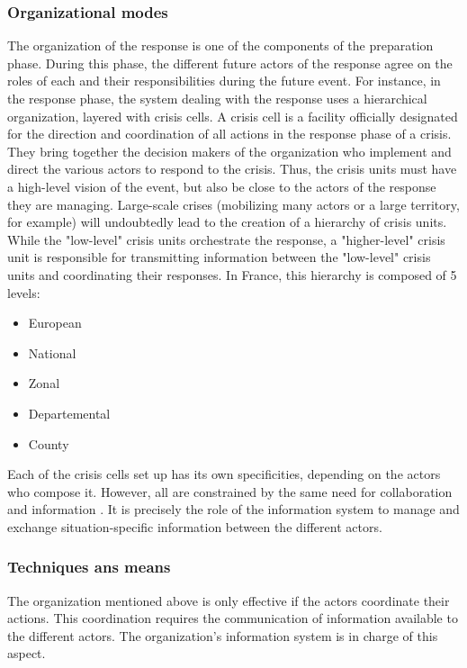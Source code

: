 \subsubsection{Organizational modes}
The organization of the response is one of the components of the preparation phase.
During this phase, the different future actors of the response agree on the roles of each and their responsibilities during the future event.
For instance, in the response phase, the system dealing with the response uses a hierarchical organization, layered with crisis cells.
A crisis cell is a facility officially designated for the direction and coordination of all actions in the response phase of a crisis.
They bring together the decision makers of the organization who implement and direct the various actors to respond to the crisis.
Thus, the crisis units must have a high-level vision of the event, but also be close to the actors of the response they are managing.
Large-scale crises (mobilizing many actors or a large territory, for example) will undoubtedly lead to the creation of a hierarchy of crisis units.
While the "low-level" crisis units orchestrate the response, a "higher-level" crisis unit is responsible for transmitting information between the "low-level" crisis units and coordinating their responses.
In France, this hierarchy is composed of 5 levels:
\begin{itemize}
    \item European
    \item National
    \item Zonal
    \item Departemental
    \item County
\end{itemize}
Each of the crisis cells set up has its own specificities, depending on the actors who compose it.
However, all are constrained by the same need for collaboration \cite{benabenAIFrameworkMetamodel2020,comfortCrisisManagementHindsight2007} and information \cite{comfortCrisisManagementHindsight2007,endsleyTheorySituationAwareness1995}.
It is precisely the role of the information system to manage and exchange situation-specific information between the different actors.

\subsubsection{Techniques ans means}
The organization mentioned above is only effective if the actors coordinate their actions.
This coordination requires the communication of information available to the different actors.
The organization's information system is in charge of this aspect.

